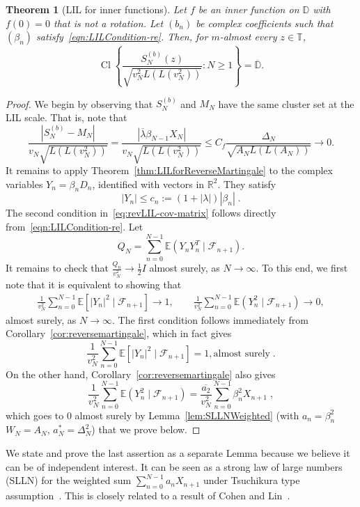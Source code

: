 \documentclass[12pt, reqno, final, a4paper]{amsart}
\theoremstyle{plain}
\newtheorem{theorem}{Theorem}[section]
\theoremstyle{definition}
\theoremstyle{remark}
\DeclareMathOperator{\Cl}{Cl}
\newcommand{\T}{\mathbb T}
\newcommand{\E}{\mathbb E}
\newcommand{\1}{\mathbf 1}
\begin{document}
\begin{theorem}[LIL for inner functions]
\label{thm:GeneralLIL-martingale}
Let $f$ be an inner function on $\mathbb D$ with $f(0)=0$ that is not a
rotation. Let $(b_n)$ be complex coefficients such that $(\beta_n)$ satisfy~\eqref{eqn:LILCondition-re}. Then, for $m$-almost every $z\in\T$,
\[
 \Cl\left\{
 \frac{S_N^{(b)}(z)}{\sqrt{v_N^2L(L(v_N^2))}}:N\ge1
 \right\}=\overline{\mathbb D}.
\]
\end{theorem}
\begin{proof}
We begin by observing that $S_N^{(b)}$ and $M_N$ have the same cluster set at the LIL scale. That is, note that 
\[
\frac{|S_N^{(b)}-M_N|}
 {v_N\sqrt{L(L(v_N^2))}}= \frac{|\overline\lambda\beta_{N-1}X_N|}
 {v_N\sqrt{L(L(v_N^2))}}
 \le C_f\frac{\Delta_N}{\sqrt{A_NL(L(A_N))}}\longrightarrow 0.
\]
It remains to apply Theorem~\ref{thm:LILforReverseMartingale} to the complex
variables $Y_n=\beta_nD_n$, identified with vectors in $\mathbb R^2$. They satisfy
\[
 |Y_n|\le c_n:= (1+|\lambda|)|\beta_n|\;.
\]
The second condition in~\eqref{eq:revLIL-cov-matrix} follows directly from~\eqref{eqn:LILCondition-re}. Let 
\[
  Q_N=\sum_{n=0}^{N-1}\E(Y_nY_n^T\mid\mathcal F_{n+1}).
\]
It remains to check that $\frac{Q_n}{v_N^2}\to \frac{1}{2}I$ almost surely, as $N\to \infty$. To this end, we first note that it is equivalent to showing that 
\begin{align*}
    \frac{1}{v_N^2}\sum_{n=0}^{N-1}\E[|Y_n|^2\mid \mathcal{F}_{n+1}] \to 1,\qquad \frac{1}{v_N^2}\sum_{n=0}^{N-1}\E(Y_n^2\mid\mathcal F_{n+1}) \to 0, 
\end{align*}
almost surely, as $N\to \infty$. 
The first condition follows immediately from Corollary~\ref{cor:reversemartingale}, which in fact gives
\[
\frac{1}{v_N^2}\sum_{n=0}^{N-1}\E[|Y_n|^2\mid \mathcal{F}_{n+1}] =1, \text{almost surely}\;.
\]
On the other hand, Corollary~\ref{cor:reversemartingale} also gives
\[
 \frac{1}{v_N^2}\sum_{n=0}^{N-1}\E(Y_n^2\mid\mathcal F_{n+1}) = \frac{\overline{a_2}}{v_N^2}\sum_{n=0}^{N-1}\beta_n^2X_{n+1}\;,
\]
which goes to $0$ almost surely by Lemma~\ref{lem:SLLNWeighted} (with $a_n=\beta_n^2$
$W_N=A_N$, $a_N^*=\Delta_N^2$) that we prove below.

\end{proof}

We state and prove the last assertion as a separate Lemma because we believe it can be of independent interest. It can be seen as a strong law of large numbers (SLLN) for the weighted sum $\sum_{n=0}^{N-1}a_nX_{n+1}$ under Tsuchikura type assumption~\cite{Tsuchi51}. This is closely related to a result of Cohen and Lin~\cite{CohenLin09}. 
\end{document}
